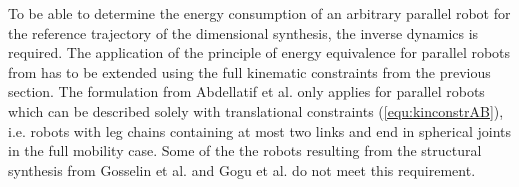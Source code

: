 \documentclass[fleqn,a4paper,10pt]{article}
\newcommand{\bm}[1]{\mathbf{#1}}
\begin{document}
\begin{multicols}{2}
\begin{figure}
\centering

\label{fig:details_kindyn}
\end{figure}


To be able to determine the energy consumption of an arbitrary parallel robot for the reference trajectory of the dimensional synthesis, the inverse dynamics is required.
The application of the principle of energy equivalence for parallel robots from \cite{AbdellatifHei2009,DoThanhKotHeiOrt2009b} has to be extended using the full kinematic constraints from the previous section.
The formulation from Abdellatif et al. \cite{AbdellatifHei2009} only applies for parallel robots which can be described solely with translational constraints (\ref{equ:kinconstrAB}), i.e. robots with leg chains containing at most two links and end in spherical joints in the full mobility case.
Some of the the robots resulting from the structural synthesis from Gosselin et al. \cite{KongGos2007} and Gogu et al. \cite{Gogu2008} do not meet this requirement.


\end{multicols}
\end{document}
